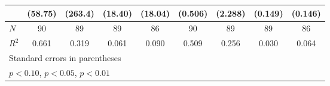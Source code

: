 {\begin{tabular}{l*{8}{c}}
            &     (58.75)         &     (263.4)         &     (18.40)         &     (18.04)         &     (0.506)         &     (2.288)         &     (0.149)         &     (0.146)         \\
\hline
\(N\)       &          90         &          89         &          89         &          86         &          90         &          89         &          89         &          86         \\
\(R^{2}\)   &       0.661         &       0.319         &       0.061         &       0.090         &       0.509         &       0.256         &       0.030         &       0.064         \\
\hline\hline
\multicolumn{9}{l}{\footnotesize Standard errors in parentheses}\\
\multicolumn{9}{l}{\footnotesize \sym{*} \(p<0.10\), \sym{**} \(p<0.05\), \sym{***} \(p<0.01\)}\\
\end{tabular}
}
